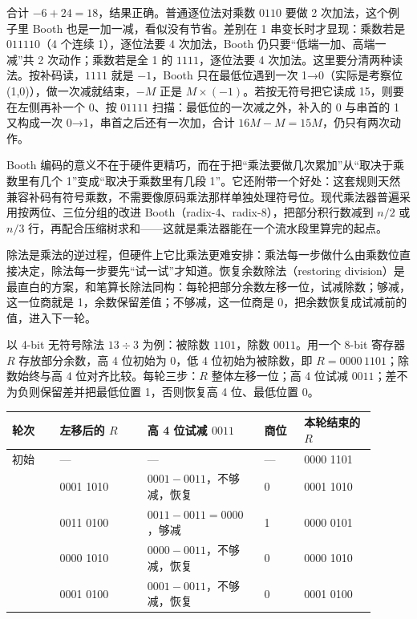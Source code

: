 合计 $-6+24=18$，结果正确。普通逐位法对乘数 $0110$ 要做 2 次加法，这个例子里 Booth 也是一加一减，看似没有节省。差别在 1 串变长时才显现：乘数若是 $011110$（4 个连续 1），逐位法要 4 次加法，Booth 仍只要“低端一加、高端一减”共 2 次动作；乘数若是全 1 的 $1111$，逐位法要 4 次加法。这里要分清两种读法。按补码读，$1111$ 就是 $-1$，Booth 只在最低位遇到一次 1→0（实际是考察位 (1,0)），做一次减就结束，$-M$ 正是 $M\times(-1)$。若按无符号把它读成 15，则要在左侧再补一个 0、按 $01111$ 扫描：最低位的一次减之外，补入的 0 与串首的 1 又构成一次 0→1，串首之后还有一次加，合计 $16M-M=15M$，仍只有两次动作。

Booth 编码的意义不在于硬件更精巧，而在于把“乘法要做几次累加”从“取决于乘数里有几个 1”变成“取决于乘数里有几段 1”。它还附带一个好处：这套规则天然兼容补码有符号乘数，不需要像原码乘法那样单独处理符号位。现代乘法器普遍采用按两位、三位分组的改进 Booth（radix-4、radix-8），把部分积行数减到 $n/2$ 或 $n/3$ 行，再配合压缩树求和——这就是乘法器能在一个流水段里算完的起点。


除法是乘法的逆过程，但硬件上它比乘法更难安排：乘法每一步做什么由乘数位直接决定，除法每一步要先“试一试”才知道。恢复余数除法（restoring division）是最直白的方案，和笔算长除法同构：每轮把部分余数左移一位，试减除数；够减，这一位商就是 1，余数保留差值；不够减，这一位商是 0，把余数恢复成试减前的值，进入下一轮。

以 4-bit 无符号除法 $13\div3$ 为例：被除数 $1101$，除数 $0011$。用一个 8-bit 寄存器 $R$ 存放部分余数，高 4 位初始为 0，低 4 位初始为被除数，即 $R=0000\,1101$；除数始终与高 4 位对齐比较。每轮三步：$R$ 整体左移一位；高 4 位试减 $0011$；差不为负则保留差并把最低位置 1，否则恢复高 4 位、最低位置 0。

\begin{longtable}{L{0.12\linewidth}L{0.22\linewidth}L{0.28\linewidth}L{0.1\linewidth}L{0.18\linewidth}}
\toprule
轮次 & 左移后的 $R$ & 高 4 位试减 $0011$ & 商位 & 本轮结束的 $R$ \\
\midrule
初始 & --- & --- & --- & 0000 1101 \\ & 0001 1010 & $0001-0011$，不够减，恢复 & 0 & 0001 1010 \\ & 0011 0100 & $0011-0011=0000$，够减 & 1 & 0000 0101 \\ & 0000 1010 & $0000-0011$，不够减，恢复 & 0 & 0000 1010 \\ & 0001 0100 & $0001-0011$，不够减，恢复 & 0 & 0001 0100 \\
\bottomrule
\end{longtable}

